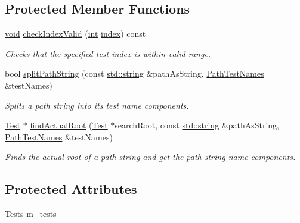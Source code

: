 \subsection*{Protected Member Functions}
\begin{DoxyCompactItemize}
\item 
\hyperlink{wglew_8h_aeea6e3dfae3acf232096f57d2d57f084}{void} \hyperlink{class_test_path_aebf839170b1a9e8199dd26f307028b6a}{check\-Index\-Valid} (\hyperlink{wglew_8h_a500a82aecba06f4550f6849b8099ca21}{int} \hyperlink{fmod__codec_8h_a57f14e05b1900f16a2da82ade47d0c6d}{index}) const 
\begin{DoxyCompactList}\small\item\em Checks that the specified test index is within valid range. \end{DoxyCompactList}\item 
bool \hyperlink{class_test_path_a7b65b26e7287763ca94ff0fadca37652}{split\-Path\-String} (const \hyperlink{glew_8h_ae84541b4f3d8e1ea24ec0f466a8c568b}{std\-::string} \&path\-As\-String, \hyperlink{class_test_path_a525c33f5b897710bf37cf593160e562a}{Path\-Test\-Names} \&test\-Names)
\begin{DoxyCompactList}\small\item\em Splits a path string into its test name components. \end{DoxyCompactList}\item 
\hyperlink{class_test}{Test} $\ast$ \hyperlink{class_test_path_a4fb2b835af58884dc718a3692f013868}{find\-Actual\-Root} (\hyperlink{class_test}{Test} $\ast$search\-Root, const \hyperlink{glew_8h_ae84541b4f3d8e1ea24ec0f466a8c568b}{std\-::string} \&path\-As\-String, \hyperlink{class_test_path_a525c33f5b897710bf37cf593160e562a}{Path\-Test\-Names} \&test\-Names)
\begin{DoxyCompactList}\small\item\em Finds the actual root of a path string and get the path string name components. \end{DoxyCompactList}\end{DoxyCompactItemize}
\subsection*{Protected Attributes}
\begin{DoxyCompactItemize}
\item 
\hyperlink{class_test_path_aa1f2a0a7e01597a16ed041776297fbdf}{Tests} \hyperlink{class_test_path_aeda882fdb18011525ab63a6543648090}{m\-\_\-tests}
\end{DoxyCompactItemize}


